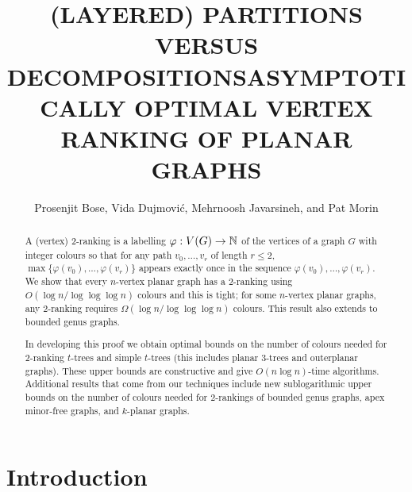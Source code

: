 \documentclass[kpfonts]{patmorin}
\title{\MakeUppercase{(Layered) Partitions versus Decompositions}}
\author{}
\title{\MakeUppercase{Asymptotically Optimal Vertex Ranking of Planar Graphs}}
\author{Prosenjit Bose, Vida Dujmović, Mehrnoosh Javarsineh, and Pat Morin}
\theoremstyle{named}
\begin{document}
\begin{titlepage}
\maketitle

\begin{abstract}
  A (vertex) 2-ranking is a labelling $\varphi:V(G)\to\mathbb{N}$ of the vertices of a graph $G$ with integer colours so that for any path $v_0,\ldots,v_r$ of length $r\le 2$, $\max\{\varphi(v_0),\ldots,\varphi(v_r)\}$ appears exactly once in the sequence $\varphi(v_0),\ldots,\varphi(v_r)$.  We show that every $n$-vertex planar graph has a 2-ranking using $O(\log n/\log\log\log n)$ colours and this is tight; for some $n$-vertex planar graphs, any 2-ranking requires $\Omega(\log n/\log\log\log n)$ colours.  This result also extends to bounded genus graphs.

  In developing this proof we obtain optimal bounds on the number of colours needed for 2-ranking $t$-trees and simple $t$-trees (this includes planar 3-trees and outerplanar graphs).  These upper bounds are constructive and give $O(n\log n)$-time algorithms.  Additional results that come from our techniques include new sublogarithmic upper bounds on the number of colours needed for 2-rankings of bounded genus graphs, apex minor-free graphs, and $k$-planar graphs.
\end{abstract}
\end{titlepage}

\tableofcontents

\newpage
{}

\section{Introduction}
\end{document}
